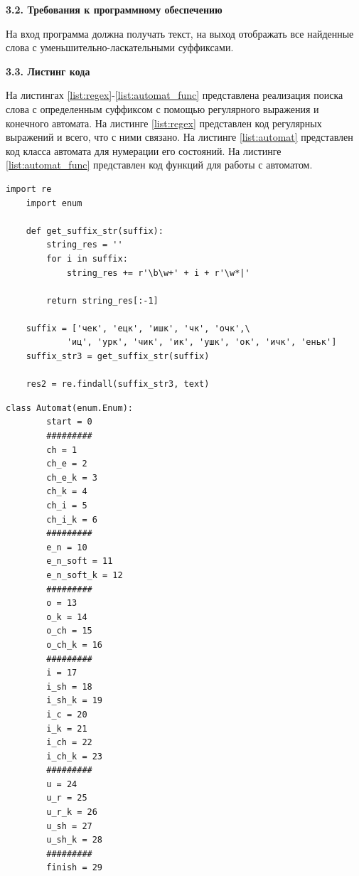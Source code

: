 \documentclass[a4paper,12pt]{report}
\begin{document}
	\begin{center}
		\textbf{3.2. Требования к программному обеспечению}
	\end{center}
		
			На вход программа должна получать текст, на выход отображать все найденные слова с уменьшительно-ласкательными суффиксами.

	\begin{center}
		\textbf{3.3. Листинг кода}
	\end{center}
		
		На листингах \ref{list:regex}-\ref{list:automat_func} представлена реализация поиска слова с определенным суффиксом с помощью регулярного выражения и конечного автомата.
		На листинге \ref{list:regex} представлен код регулярных выражений и всего, что с ними связано.
		На листинге \ref{list:automat} представлен код класса автомата для нумерации его состояний.
		На листинге \ref{list:automat_func} представлен код функций для работы с автоматом.	
		
			\begin{lstlisting}[frame = single, breaklines, label = list:regex, caption = Листинг разработанных регулярных выражений и функций\, с ними работающих]
	import re
	import enum
			
	def get_suffix_str(suffix):
	    string_res = ''
	    for i in suffix:
	        string_res += r'\b\w+' + i + r'\w*|'
			
	    return string_res[:-1]
			
	suffix = ['чек', 'ецк', 'ишк', 'чк', 'очк',\ 
			'иц', 'урк', 'чик', 'ик', 'ушк', 'ок', 'ичк', 'еньк']
	suffix_str3 = get_suffix_str(suffix)
	
	res2 = re.findall(suffix_str3, text)
			\end{lstlisting} 
		
	        \begin{lstlisting}[frame = single, breaklines, label = list:automat, caption = Листинг класса для нумерации состояний автомата]
	class Automat(enum.Enum):
		start = 0
		#########
		ch = 1
		ch_e = 2
		ch_e_k = 3
		ch_k = 4
		ch_i = 5
		ch_i_k = 6
		#########
		e_n = 10
		e_n_soft = 11
		e_n_soft_k = 12
		#########
		o = 13
		o_k = 14
		o_ch = 15
		o_ch_k = 16
		#########
		i = 17
		i_sh = 18
		i_sh_k = 19
		i_c = 20
		i_k = 21
		i_ch = 22
		i_ch_k = 23
		#########
		u = 24
		u_r = 25
		u_r_k = 26
		u_sh = 27
		u_sh_k = 28
		#########
		finish = 29
	        \end{lstlisting} 
	        
\end{document}
